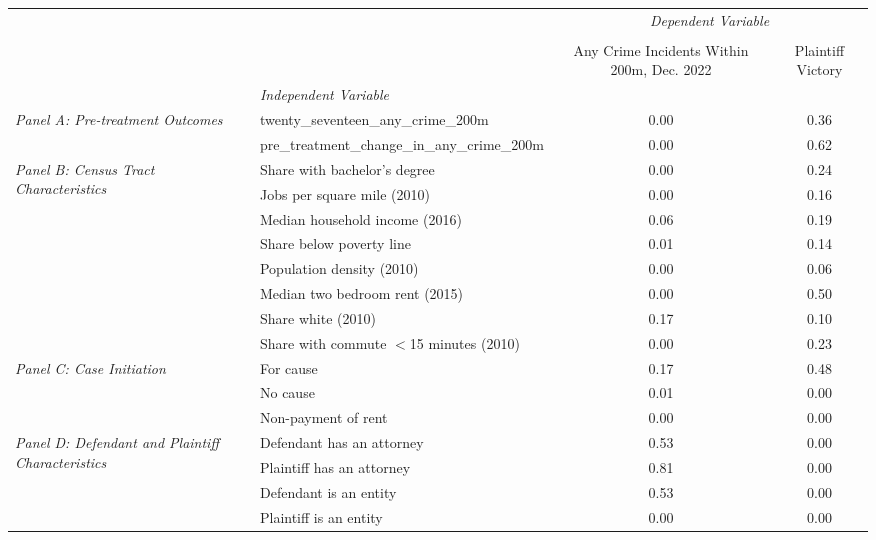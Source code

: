 \begin{tabular}{llcc}
\toprule
 &  & \multicolumn{2}{c}{\textit{Dependent Variable}} \\
\cline{3-4}
\\
 &  & Any Crime Incidents Within 200m, Dec. 2022 & Plaintiff Victory \\
 & \emph{Independent Variable} &  &  \\
\midrule
\multirow[c]{2}{3cm}{\textit{Panel A: Pre-treatment Outcomes}} & twenty_seventeen_any_crime_200m & 0.00 & 0.36 \\
 & pre_treatment_change_in_any_crime_200m & 0.00 & 0.62 \\
\cline{1-4}
\multirow[c]{8}{3cm}{\textit{Panel B: Census Tract Characteristics}} & Share with bachelor's degree & 0.00 & 0.24 \\
 & Jobs per square mile (2010) & 0.00 & 0.16 \\
 & Median household income (2016) & 0.06 & 0.19 \\
 & Share below poverty line & 0.01 & 0.14 \\
 & Population density (2010) & 0.00 & 0.06 \\
 & Median two bedroom rent (2015) & 0.00 & 0.50 \\
 & Share white (2010) & 0.17 & 0.10 \\
 & Share with commute $<$15 minutes (2010) & 0.00 & 0.23 \\
\cline{1-4}
\multirow[c]{3}{3cm}{\textit{Panel C: Case Initiation}} & For cause & 0.17 & 0.48 \\
 & No cause & 0.01 & 0.00 \\
 & Non-payment of rent & 0.00 & 0.00 \\
\cline{1-4}
\multirow[c]{4}{3cm}{\textit{Panel D: Defendant and Plaintiff Characteristics}} & Defendant has an attorney & 0.53 & 0.00 \\
 & Plaintiff has an attorney & 0.81 & 0.00 \\
 & Defendant is an entity & 0.53 & 0.00 \\
 & Plaintiff is an entity & 0.00 & 0.00 \\
\cline{1-4}
\bottomrule
\end{tabular}
